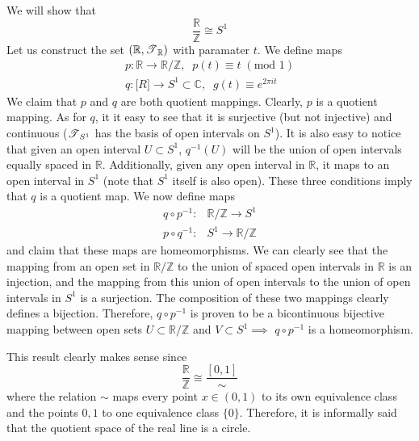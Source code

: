   \begin{example}
    We will show that
    \begin{equation}
      \frac{\mathbb{R}}{\mathbb{Z}} \cong S^1
    \end{equation}
    Let us construct the set $(\mathbb{R}, \operatorname{\mathscr{T}}_{\mathbb{R}})$ with paramater $t$. We define maps
    \begin{align*}
      p: \mathbb{R} \rightarrow \mathbb{R} / \mathbb{Z}, \;\; p(t) \equiv t \; (\text{mod } 1) \\
      q: \mathbb[R] \rightarrow S^1 \subset \mathbb{C}, \;\; g(t) \equiv e^{2 \pi i t} 
    \end{align*}
    We claim that $p$ and $q$ are both quotient mappings. Clearly, $p$ is a quotient mapping. As for $q$, it it easy to see that it is surjective (but not injective) and continuous ($\operatorname{\mathscr{T}}_{S^1}$ has the basis of open intervals on $S^1$). It is also easy to notice that given an open interval $U \subset S^1$, $q^{-1}(U)$ will be the union of open intervals equally spaced in $\mathbb{R}$. Additionally, given any open interval in $\mathbb{R}$, it maps to an open interval in $S^1$ (note that $S^1$ itself is also open). These three conditions imply that $q$ is a quotient map. We now define maps 
    \begin{align}
      q \circ p^{-1}: & \mathbb{R} / \mathbb{Z} \rightarrow S^1 \\
      p \circ q^{-1}: & S^1 \rightarrow \mathbb{R} / \mathbb{Z}
    \end{align}
    and claim that these maps are homeomorphisms. We can clearly see that the mapping from an open set in $\mathbb{R} / \mathbb{Z}$ to the union of spaced open intervals in $\mathbb{R}$ is an injection, and the mapping from this union of open intervals to the union of open intervals in $S^1$ is a surjection. The composition of these two mappings clearly defines a bijection. Therefore, $q \circ p^{-1}$ is proven to be a bicontinuous bijective mapping between open sets $U \subset \mathbb{R} / \mathbb{Z}$ and $V \subset S^1 \implies$ $q \circ p^{-1}$ is a homeomorphism. 

    This result clearly makes sense since 
    \begin{equation}
      \frac{\mathbb{R}}{\mathbb{Z}} \cong \frac{[0,1]}{\sim}
    \end{equation}
    where the relation $\sim$ maps every point $x \in (0,1)$ to its own equivalence class and the points $0, 1$ to one equivalence class $\{0\}$. Therefore, it is informally said that the quotient space of the real line is a circle. 


\end{example}
